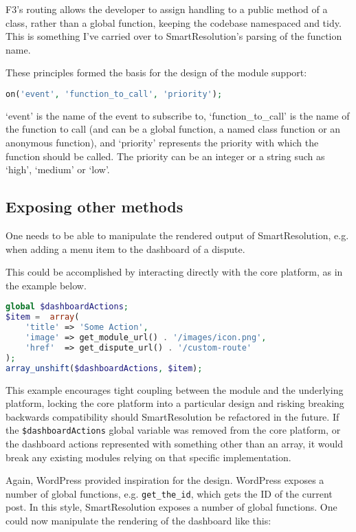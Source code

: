 F3's routing allows the developer to assign handling to a public method of a class, rather than a global function, keeping the codebase namespaced and tidy. This is something I've carried over to SmartResolution's parsing of the function name.

These principles formed the basis for the design of the module support:

\begin{lstlisting}[language=php]
on('event', 'function_to_call', 'priority');
\end{lstlisting}

`event' is the name of the event to subscribe to, `function\_to\_call' is the name of the function to call (and can be a global function, a named class function or an anonymous function), and `priority' represents the priority with which the function should be called. The priority can be an integer or a string such as `high', `medium' or `low'.

\subsection{Exposing other methods}

One needs to be able to manipulate the rendered output of SmartResolution, e.g. when adding a menu item to the dashboard of a dispute.

This could be accomplished by interacting directly with the core platform, as in the example below.

\begin{lstlisting}[language=php]
global $dashboardActions;
$item =  array(
    'title' => 'Some Action',
    'image' => get_module_url() . '/images/icon.png',
    'href'  => get_dispute_url() . '/custom-route'
);
array_unshift($dashboardActions, $item);
\end{lstlisting}

This example encourages tight coupling between the module and the underlying platform, locking the core platform into a particular design and risking breaking backwards compatibility should SmartResolution be refactored in the future. If the \lstinline{$dashboardActions} global variable was removed from the core platform, or the dashboard actions represented with something other than an array, it would break any existing modules relying on that specific implementation.

Again, WordPress provided inspiration for the design. WordPress exposes a number of global functions, e.g. \lstinline{get_the_id}, which gets the ID of the current post. In this style, SmartResolution exposes a number of global functions. One could now manipulate the rendering of the dashboard like this:

